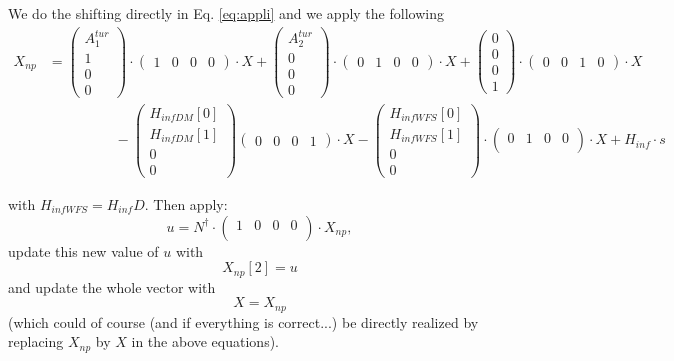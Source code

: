 \documentclass[a4,10pt]{article}
\begin{document}
We do the shifting directly in Eq. \ref{eq:appli}
and we apply the following
\begin{align}
X_{np} &= \begin{pmatrix}
A_{1}^{tur} \\
1\\
0\\
0\end{pmatrix}\cdot \begin{pmatrix}
1 & 0 & 0 & 0\end{pmatrix}\cdot X + \begin{pmatrix}
A_{2}^{tur} \\
0\\
0\\
0\end{pmatrix}\cdot \begin{pmatrix}
0 & 1 & 0 & 0\end{pmatrix}\cdot X + \begin{pmatrix}
0\\
0\\
0\\
1\end{pmatrix}\cdot\begin{pmatrix}
0 & 0 & 1 & 0\end{pmatrix}\cdot X \nonumber \\
&\hspace{2cm} - \begin{pmatrix}H_{infDM}[0]\\ H_{infDM}[1]\\ 0 \\ 0\end{pmatrix}
\begin{pmatrix}
0 & 0 & 0 & 1\end{pmatrix}\cdot X - \begin{pmatrix}H_{infWFS}[0]\\H_{infWFS}[1]\\0\\0\end{pmatrix} \cdot \left( \begin{array}{cccc} 0 & 1 & 0 & 0\\ \end{array}\right) \cdot X
+ H_{inf} \cdot s
\label{eq:appli}
\end{align}

with $H_{infWFS}=H_{inf}D$. Then apply:
\begin{equation}
u = N^{\dag} \cdot \left( \begin{array}{cccc}
  1&0&0&0\\ \end{array}\right)\cdot X_{np},
\end{equation}
update this new value of $u$ with
\begin{equation}
X_{np}[2]=u
\end{equation}
and update the whole vector with
\begin{equation}
X=X_{np}
\end{equation}
(which could of course (and if everything is correct...) be directly realized by replacing $X_{np}$ by $X$ in the above equations).
\end{document}
